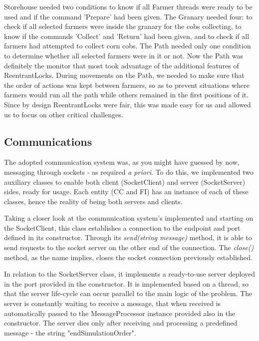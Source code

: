 \documentclass[12pt]{article}
\begin{document}
Storehouse needed two conditions to know if all Farmer threads were ready to be used and if the command 'Prepare' had been given.
The Granary needed four: to check if all selected farmers were inside the granary for the cobs collecting, to know if the commands 'Collect' and 'Return' had 
been given, and to check if all farmers had attempted to collect corn cobs.
The Path needed only one condition to determine whether all selected farmers were in it or not.
Now the Path was definitely the monitor that most took advantage of the additional features of ReentrantLocks.
During movements on the Path, we needed to make sure that the order of actions was kept between farmers, so as to prevent situations where farmers would run all 
the path while others remained in the first positions of it.
Since by design ReentrantLocks were fair, this was made easy for us and allowed us to focus on other critical challenges.

\subsection{Communications} \label{communications} %

The adopted communication system was, as you might have guessed by now, messaging through sockets - as required \textit{a priori}. %
To do this, we implemented two auxiliary classes to enable both client (SocketClient) and server (SocketServer) sides, ready for usage. 
Each entity (CC and FI) has an instance of each of these classes, hence the reality of being both servers and clients.

Taking a closer look at the communication system's implemented and starting on the SocketClient, this class establishes a connection to the endpoint and port 
defined in its constructor.
Through its \textit{send(string message)} method, it is able to send requests to the socket server on the other end of the connection.
The \textit{close()} method, as the name implies, closes the socket connection previously established.

In relation to the SocketServer class, it implements a ready-to-use server deployed in the port provided in the constructor. 
It is implemented based on a thread, so that the server life-cycle can occur parallel to the main logic of the problem. 
The server is constantly waiting to receive a message, that when received is automatically passed to the MessageProcessor instance provided also in the constructor. 
The server dies only after receiving and processing a predefined message - the string "endSimulationOrder".
\end{document}
